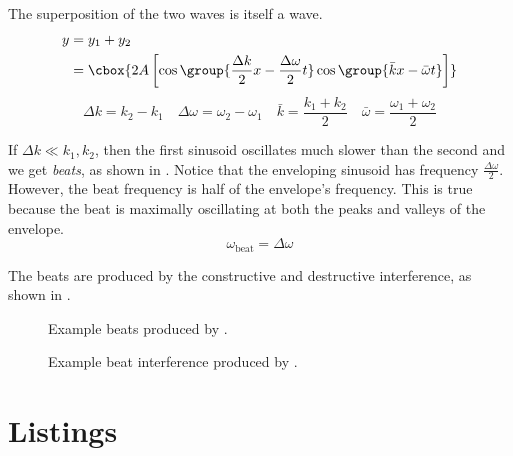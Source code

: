 \documentclass{hw}
\numberwithin{equation}{section}
\begin{document}
The superposition of the two waves is itself a wave.
\begin{align}
  y &= y_1 + y_2 \\
    &= \cbox{%
       2A \left[
        \cos\group{%
          \frac{\Delta k}{2}x - \frac{\Delta \omega}{2}t
        } 
        \cos\group{%
          \bar{k}x - \bar{\omega}t
        } 
      \right]
      }
\end{align}
\begin{equation}
  \Delta k = k_2 - k_1                         \quad 
  \Delta \omega = \omega_2 - \omega_1          \quad
  \bar{k} = \frac{k_1 + k_2}{2}                \quad
  \bar{\omega} = \frac{\omega_1 + \omega_2}{2} 
\end{equation}

If $\Delta k \ll k_1, k_2$, then the first sinusoid oscillates much slower than
the second and we get \emph{beats}, as shown in . Notice that the
enveloping sinusoid has frequency $\frac{\Delta \omega}{2}$. However, the beat
frequency is half of the envelope's frequency. This is true because the beat is
maximally oscillating at both the peaks and valleys of the envelope.
\begin{equation}
  \omega_{\text{beat}} = \Delta \omega
\end{equation}

The beats are produced by the constructive and destructive interference, as
shown in .

\begin{figure}[ht]
  \centering
  \resizebox{\textwidth}{!}{}
  \caption{Example beats produced by .}
  \label{fig:beats}
\end{figure}

\begin{figure}[ht]
  \centering
  \resizebox{\textwidth}{!}{}
  \caption{Example beat interference produced by .}
  \label{fig:beats-interference}
\end{figure}

\section{Listings}
\end{document}
